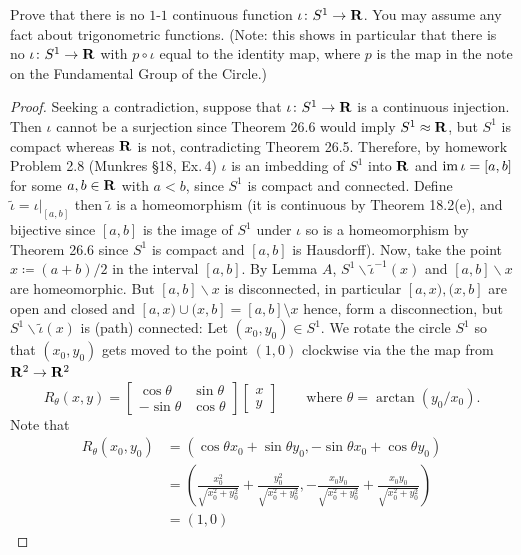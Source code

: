 \newpage
\begin{problem}[(C)]
Prove that there is no $1$-$1$ continuous function $\iota\colon
S^1\to\mathbf{R}$. You may assume any fact about trigonometric
functions. (Note: this shows in particular that there is no
$\iota\colon S^1\to\mathbf{R}$ with $p\circ\iota$ equal to the identity
map, where $p$ is the map in the note on the Fundamental Group of
the Circle.)
\end{problem}
\begin{proof}
Seeking a contradiction, suppose that $\iota\colon S^1\to\mathbf{R}$ is a
continuous injection. Then $\iota$ cannot be a surjection since Theorem
26.6 would imply $S^1\approx\mathbf{R}$, but $S^1$ is compact whereas $\mathbf{R}$ is
not, contradicting Theorem 26.5. Therefore, by homework Problem 2.8
(Munkres \S18, Ex.\,4) $\iota$ is an imbedding of $S^1$ into $\mathbf{R}$ and
$\operatorname{im}\iota=[a,b]$ for some $a,b\in\mathbf{R}$ with $a<b$, since $S^1$ is compact
and connected. Define $\tilde{\iota}=\left.\iota\right|_{[a,b]}$ then
$\tilde\iota$ is a homeomorphism (it is continuous by Theorem 18.2(e),
and bijective since $[a,b]$ is the image of $S^1$ under $\iota$ so is a
homeomorphism by Theorem 26.6 since $S^1$ is compact and $[a,b]$ is
Hausdorff). Now, take the point $x\coloneqq (a+b)/2$ in the interval
$[a,b]$. By Lemma $A$, $S^1\smallsetminus\tilde\iota^{-1}(x)$ and
$[a,b]\smallsetminus x$ are homeomorphic. But $[a,b]\smallsetminus x$ is
disconnected, in particular $[a,x),(x,b]$ are open and closed and
$[a,x)\cup(x,b]=[a,b]\setminus x$ hence, form a disconnection, but
$S^1\smallsetminus\tilde\iota(x)$ is (path) connected: Let
$(x_0,y_0)\in S^1$. We rotate the circle $S^1$ so that
$(x_0,y_0)$ gets moved to the point $(1,0)$ clockwise via the the map from
$\mathbf{R}^2\to\mathbf{R}^2$
\[
R_\theta(x,y)=
\begin{bmatrix}
\cos\theta&\sin\theta\\
-\sin\theta&\cos\theta
\end{bmatrix}
\begin{bmatrix}
x\\y
\end{bmatrix}
\qquad\text{where $\theta=\arctan(y_0/x_0)$}.
\]
Note that
\begin{align*}
R_\theta(x_0,y_0)
&=\left(\cos\theta x_0+\sin\theta y_0,-\sin\theta x_0+\cos\theta
  y_0\right)\\
&=\left(\frac{x_0^2}{\sqrt{x_0^2+y_0^2}}+\frac{y_0^2}{\sqrt{x_0^2+y_0^2}}
  ,-\frac{x_0y_0}{\sqrt{x_0^2+y_0^2}}+\frac{x_0y_0}{\sqrt{x_0^2+y_0^2}}\right)\\
&=(1,0)
\end{align*}

\end{proof}
